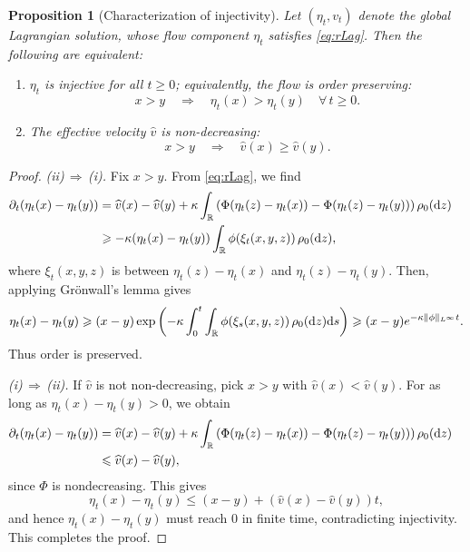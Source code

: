 \documentclass[10pt,reqno]{amsart}
\renewcommand{\geq}{\geqslant}
\renewcommand{\ge}{\geqslant}
\renewcommand{\leq}{\leqslant}
\numberwithin{equation}{section}
\newtheorem{proposition}{Proposition}[section]
\newcommand{\R}{\mathbb R}
\newcommand{\lt}{\left}
\newcommand{\rt}{\right}
\newcommand{\pa}{\partial}
\newcommand{\dz}{\textnormal{d}z}
\newcommand{\ds}{\textnormal{d}s}
\begin{document}
\begin{proposition}[Characterization of injectivity]\label{prop:inj_reg}
Let $(\eta_t,v_t)$ denote the global Lagrangian solution, whose flow component $\eta_t$ satisfies \eqref{eq:rLag}. Then the following are equivalent:
\begin{enumerate}
\item[(i)] $\eta_t$ is injective for all $t\ge 0$; equivalently, the flow is 
order preserving:
\[
x>y \quad\Longrightarrow\quad \eta_t(x)>\eta_t(y)\quad\forall\,t\ge 0.
\]

\item[(ii)] The effective velocity $\widehat v$ is non-decreasing:
\[
x>y \quad\Longrightarrow\quad \widehat v(x)\ge \widehat v(y).
\]
\end{enumerate}
\end{proposition}
\begin{proof}
\emph{(ii)\,$\Rightarrow$\,(i).}  
Fix $x>y$. From \eqref{eq:rLag}, we find
\begin{align*}
\pa_t (\eta_t(x) - \eta_t(y)) &= \widehat v(x) - \widehat v(y) + \kappa \int_\R \lt(\Phi(\eta_t(z)-\eta_t(x)) - \Phi(\eta_t(z)-\eta_t(y))\rt)\rho_0(\dz)\cr
&\geq -\kappa(\eta_t(x) - \eta_t(y)) \int_\R \phi(\xi_t(x,y,z))\,\rho_0(\dz),
\end{align*}
where $\xi_t(x,y,z)$ is between $\eta_t(z)-\eta_t(x)$ and $\eta_t(z)-\eta_t(y)$. Then, applying Gr\"onwall's lemma gives
\[
\eta_t(x) - \eta_t(y) \geq (x-y) \exp\lt(  -\kappa \int_0^t  \int_\R \phi(\xi_s(x,y,z))\,\rho_0(\dz) \ds\rt) \geq (x-y) e^{-\kappa \|\phi\|_{L^\infty} t}.
\]
Thus order is preserved.

\medskip
\emph{(i)\,$\Rightarrow$\,(ii).}
If $\widehat v$ is not non-decreasing, pick $x>y$ with 
$\widehat v(x)<\widehat v(y)$.  
For as long as $\eta_t(x) - \eta_t(y) > 0$, we obtain
\begin{align*}
\pa_t (\eta_t(x) - \eta_t(y)) &= \widehat v(x) - \widehat v(y) + \kappa \int_\R \lt(\Phi(\eta_t(z)-\eta_t(x)) - \Phi(\eta_t(z)-\eta_t(y))\rt)\rho_0(\dz)\cr
&\leq  \widehat v(x) - \widehat v(y),
\end{align*}
since $\Phi$ is nondecreasing.
This gives
\[
\eta_t(x) - \eta_t(y) \leq (x-y) + \lt( \widehat v(x) - \widehat v(y)\rt) t,
\]
and hence $\eta_t(x) - \eta_t(y)$ must reach $0$ in finite time, contradicting injectivity. This completes the proof.
\end{proof}
 
\end{document}
